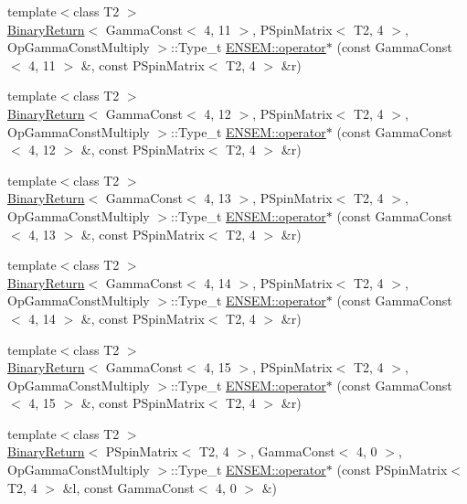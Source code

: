 \begin{DoxyCompactItemize}
\item 
{\footnotesize template$<$class T2 $>$ }\\\mbox{\hyperlink{structBinaryReturn}{Binary\+Return}}$<$ Gamma\+Const$<$ 4, 11 $>$, P\+Spin\+Matrix$<$ T2, 4 $>$, Op\+Gamma\+Const\+Multiply $>$\+::Type\+\_\+t \mbox{\hyperlink{group__primspinmatrix_gaa5f831eba31e036c6d9d828c992751ae}{E\+N\+S\+E\+M\+::operator$\ast$}} (const Gamma\+Const$<$ 4, 11 $>$ \&, const P\+Spin\+Matrix$<$ T2, 4 $>$ \&r)
\item 
{\footnotesize template$<$class T2 $>$ }\\\mbox{\hyperlink{structBinaryReturn}{Binary\+Return}}$<$ Gamma\+Const$<$ 4, 12 $>$, P\+Spin\+Matrix$<$ T2, 4 $>$, Op\+Gamma\+Const\+Multiply $>$\+::Type\+\_\+t \mbox{\hyperlink{group__primspinmatrix_gac3b96a9e74f7c7170ae4c2713382e011}{E\+N\+S\+E\+M\+::operator$\ast$}} (const Gamma\+Const$<$ 4, 12 $>$ \&, const P\+Spin\+Matrix$<$ T2, 4 $>$ \&r)
\item 
{\footnotesize template$<$class T2 $>$ }\\\mbox{\hyperlink{structBinaryReturn}{Binary\+Return}}$<$ Gamma\+Const$<$ 4, 13 $>$, P\+Spin\+Matrix$<$ T2, 4 $>$, Op\+Gamma\+Const\+Multiply $>$\+::Type\+\_\+t \mbox{\hyperlink{group__primspinmatrix_ga704b99c9b5eb26a1b2d439a1106d809b}{E\+N\+S\+E\+M\+::operator$\ast$}} (const Gamma\+Const$<$ 4, 13 $>$ \&, const P\+Spin\+Matrix$<$ T2, 4 $>$ \&r)
\item 
{\footnotesize template$<$class T2 $>$ }\\\mbox{\hyperlink{structBinaryReturn}{Binary\+Return}}$<$ Gamma\+Const$<$ 4, 14 $>$, P\+Spin\+Matrix$<$ T2, 4 $>$, Op\+Gamma\+Const\+Multiply $>$\+::Type\+\_\+t \mbox{\hyperlink{group__primspinmatrix_ga8b0118f0d96b78f8fbea926daf66af8f}{E\+N\+S\+E\+M\+::operator$\ast$}} (const Gamma\+Const$<$ 4, 14 $>$ \&, const P\+Spin\+Matrix$<$ T2, 4 $>$ \&r)
\item 
{\footnotesize template$<$class T2 $>$ }\\\mbox{\hyperlink{structBinaryReturn}{Binary\+Return}}$<$ Gamma\+Const$<$ 4, 15 $>$, P\+Spin\+Matrix$<$ T2, 4 $>$, Op\+Gamma\+Const\+Multiply $>$\+::Type\+\_\+t \mbox{\hyperlink{group__primspinmatrix_gaf61c9e0fced9fe43e7016043fadb4e98}{E\+N\+S\+E\+M\+::operator$\ast$}} (const Gamma\+Const$<$ 4, 15 $>$ \&, const P\+Spin\+Matrix$<$ T2, 4 $>$ \&r)
\item 
{\footnotesize template$<$class T2 $>$ }\\\mbox{\hyperlink{structBinaryReturn}{Binary\+Return}}$<$ P\+Spin\+Matrix$<$ T2, 4 $>$, Gamma\+Const$<$ 4, 0 $>$, Op\+Gamma\+Const\+Multiply $>$\+::Type\+\_\+t \mbox{\hyperlink{group__primspinmatrix_ga55a6793cedfea5afc1bafa2c470d0350}{E\+N\+S\+E\+M\+::operator$\ast$}} (const P\+Spin\+Matrix$<$ T2, 4 $>$ \&l, const Gamma\+Const$<$ 4, 0 $>$ \&)

\end{DoxyCompactItemize}
